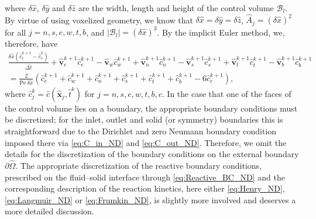 \documentclass[preprint, 1p, authoryear]{elsarticle}
\begin{document}
where $\delta \hat{x}$, $ \delta \hat{y}$  and $ \delta \hat{z}$ are the width, length and height of the control volume $\mathcal{B}_l$. 
By virtue of using voxelized geometry, we know that $\delta \hat{x} = \delta \hat{y} = \delta \hat{z}$, $\hat{A}_j = \left( \delta \hat{x}\right)^2$ for all $j=n,s,e,w,t,b$, and $|\mathcal{B}_l| = \left( \delta \hat{x}\right)^3$. By the implicit Euler method, we, therefore, have
\begin{multline}
\frac{\delta \hat{x} \left(\hat{c}_c^{k+1} - \hat{c}_c^{k}\right)}{ \Delta \hat{t}}
+ \hat{\mathbf{v}}_e^{k+1} \hat{c}_e^{k+1}- \hat{\mathbf{v}}_w \hat{c}_w^{k+1} + \hat{\mathbf{v}}_n^{k+1} \hat{c}_n^{k+1}- \hat{\mathbf{v}}_s^{k+1} \hat{c}_s^{k+1}+ \hat{\mathbf{v}}_t^{k+1} \hat{c}_t^{k+1}- \hat{\mathbf{v}}_b^{k+1} \hat{c}_b^{k+1} \\ = \frac{2 }{\mathrm{Pe} \: \delta \hat{x}} \left( \hat{c}_e^{k+1} + \hat{c}_w^{k+1} +\hat{c}_n^{k+1} + \hat{c}_s^{k+1} + \hat{c}_t^{k+1}+ \hat{c}_b^{k+1} -6 \hat{c}_c^{k+1}\right), \label{eq:Finite_Volume_Dis_2}
\end{multline}
where  $\hat{c}_j^{k}= \hat{c}(\hat{\mathbf{x}}_j, \hat{t}^{k})$ for $j=n,s,e,w,t,b,c$.   In the case that one of the faces of the control volume lies on a boundary, the appropriate boundary conditions must be  discretized; for the inlet, outlet and solid (or symmetry) boundaries this is straightforward due to the Dirichlet and zero Neumann boundary condition imposed there via \eqref{eq:C_in_ND} and \eqref{eq:C_out_ND}. Therefore, we omit the details  for the discretization of the boundary conditions on the external boundary $\partial \hat{\Omega}$.  The appropriate discretization of the reactive boundary conditions, prescribed on the fluid--solid interface through \eqref{eq:Reactive_BC_ND}   and the corresponding description of the  reaction kinetics, here either \eqref{eq:Henry_ND},   \eqref{eq:Langmuir_ND} or \eqref{eq:Frumkin_ND},  is slightly more involved and deserves a more detailed discussion.
\end{document}
